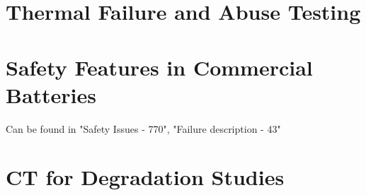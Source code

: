 \section{Thermal Failure and Abuse Testing}
\label{sec:thermal-failure-abuse-testing}

\section{Safety Features in Commercial Batteries}
\label{sec:safety-features}
Can be found in "Safety Issues - 770", "Failure description - 43"

\section{CT for Degradation Studies}
\label{sec:ct-degradation-studies}